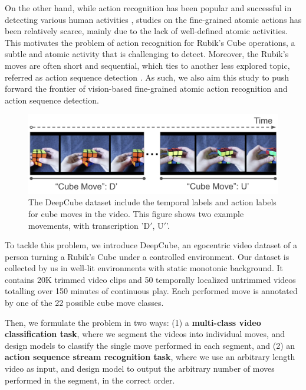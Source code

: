 \documentclass[10pt,twocolumn,letterpaper]{article}
\begin{document}
On the other hand, while action recognition has been popular and successful in detecting various human activities \cite{charades, ava, kinetics, finegym, hvu}, studies on the fine-grained atomic actions has been relatively scarce, mainly due to the lack of well-defined atomic activities. This motivates the problem of action recognition for Rubik's Cube operations, a subtle and atomic activity that is challenging to detect. Moreover, the Rubik's moves are often short and sequential, which ties to another less explored topic, referred as action sequence detection \cite{ng2019human, action_sequence_movie}. As such, we also aim this study to push forward the frontier of vision-based fine-grained atomic action recognition and action sequence detection.

\begin{figure}[]
    \centering
    \includegraphics[scale=0.35]{explain.png}
    \caption{The DeepCube dataset include the temporal labels and action labels for cube moves in the video. This figure shows two example movements, with transcription '$\text{D}'$, $\text{U}'$'.}
    \label{fig:recording_setup}
    \vspace{-2mm}
\end{figure}

To tackle this problem, we introduce DeepCube, an egocentric video dataset of a person turning a Rubik's Cube under a controlled environment. Our dataset is collected by us in well-lit environments with static monotonic background. It contains 20K trimmed video clips and 50 temporally localized untrimmed videos totalling over 150 minutes of continuous play. Each performed move is annotated by one of the 22 possible cube move classes. 

Then, we formulate the problem in two ways: (1) a \textbf{multi-class video classification task}, where we segment the videos into individual moves, and design models to classify the single move performed in each segment, and (2) an \textbf{action sequence stream recognition task}, where we use an arbitrary length video as input, and design model to output the arbitrary number of moves performed in the segment, in the correct order.
\end{document}
